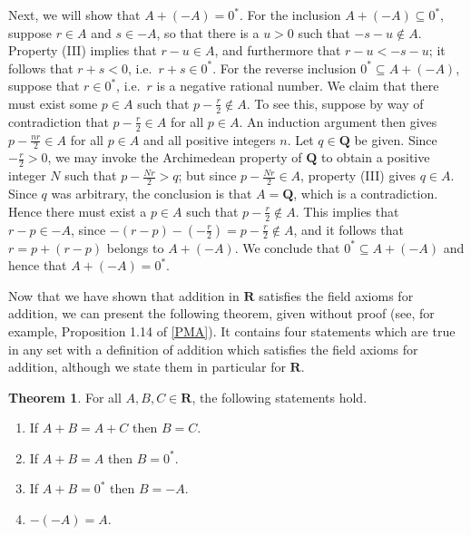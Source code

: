 \documentclass[12pt]{article}
\newcommand{\Q}{\mathbf{Q}}
\newcommand{\R}{\mathbf{R}}
\theoremstyle{definition}
\newtheorem{theorem}{Theorem}
\begin{document}
\begin{enumerate}[label = (A\arabic*)]
    Next, we will show that \( A + (-A) = 0^* \). For the inclusion \( A + (-A) \subseteq 0^* \), suppose \( r \in A \) and \( s \in -A \), so that there is a \( u > 0 \) such that \( -s - u \not\in A \). Property (III) implies that \( r - u \in A \), and furthermore that \( r - u < -s - u \); it follows that \( r + s < 0 \), i.e.\ \( r + s \in 0^* \). For the reverse inclusion \( 0^* \subseteq A + (-A) \), suppose that \( r \in 0^* \), i.e.\ \( r \) is a negative rational number. We claim that there must exist some \( p \in A \) such that \( p - \frac{r}{2} \not\in A \). To see this, suppose by way of contradiction that \( p - \frac{r}{2} \in A \) for all \( p \in A \). An induction argument then gives \( p - \frac{nr}{2} \in A \) for all \( p \in A \) and all positive integers \( n \). Let \( q \in \Q \) be given. Since \( -\frac{r}{2} > 0 \), we may invoke the Archimedean property of \( \Q \) to obtain a positive integer \( N \) such that \( p -\frac{Nr}{2} > q \); but since \( p -\frac{Nr}{2} \in A \), property (III) gives \( q \in A \). Since \( q \) was arbitrary, the conclusion is that \( A = \Q \), which is a contradiction. Hence there must exist a \( p \in A \) such that \( p - \frac{r}{2} \not\in A \). This implies that \( r - p \in -A \), since \( -(r - p) - (-\frac{r}{2}) = p - \frac{r}{2} \not\in A \), and it follows that \( r = p + (r - p) \) belongs to \( A + (-A) \). We conclude that \( 0^* \subseteq A + (-A) \) and hence that \( A + (-A) = 0^* \).
\end{enumerate}

Now that we have shown that addition in \( \R \) satisfies the field axioms for addition, we can present the following theorem, given without proof (see, for example, Proposition 1.14 of \hyperlink{pma}{[PMA]}). It contains four statements which are true in any set with a definition of addition which satisfies the field axioms for addition, although we state them in particular for \( \R \).

\begin{theorem}
\label{thm:addition_axioms}
    For all \( A, B, C \in \R \), the following statements hold.
    \begin{enumerate}[label = (\alph*)]
        \item If \( A + B = A + C \) then \( B = C \).

        \item If \( A + B = A \) then \( B = 0^* \).

        \item If \( A + B = 0^* \) then \( B = -A \).

        \item \( -(-A) = A \).
    \end{enumerate}
\end{theorem}
\end{document}
